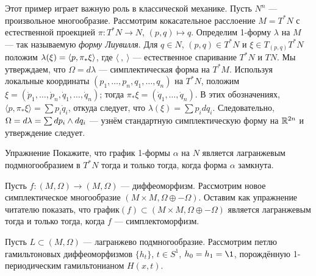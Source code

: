 Этот пример играет важную роль в классической механике.
Пусть $N^n$ --- произвольное многообразие.
Рассмотрим кокасательное расслоение $M = T^\ast N$ с естественной
проекцией $\pi\colon T^\ast N \to N$, $(p, q) \mapsto q$.
Определим 1-форму $\lambda$ на $M$ --- так называемую \emph{форму Лиувилля}.
Для $q \in N$, $(p, q) \in T^\ast N$ и $\xi \in T_{(p, q)} T^\ast N$ положим $\lambda (\xi) \z= \langle p, \pi_\ast \xi \rangle$, где $\langle\ ,\ \rangle$ --- естественное спаривание $T^\ast N$ и $TN$.
Мы утверждаем, что $\Omega = d\lambda$ --- симплектическая форма на $T^\ast M$.
Используя локальные координаты $(p_1,\dots, p_n, q_1,\dots, q_n)$ на $T^\ast N$, положим $\xi = (\dot p_1 ,\dots, \dot p_n, \dot q_1,\dots,\dot q_n)$;
тогда $\pi_\ast \xi = (\dot q_1,\dots, \dot q_n)$.
В этих обозначениях, $\langle p, \pi_\ast \xi\rangle=\sum p_i \dot q_i$, откуда следует, что $\lambda (\xi) =\sum p_i dq_i$.
Следовательно, $\Omega = d\lambda =\sum dp_i \z\wedge dq_i$ --- узнём стандартную симплектическую форму на $\mathbb{R}^{2n}$ и утверждение следует.

\begin{thm*}{Упражнение}
Покажите, что график 1-формы $\alpha$ на $N$ является лагранжевым подмногообразием в $T^\ast N$ тогда и только тогда, когда форма $\alpha$ замкнута.
\end{thm*}

\begin{thm}{}\label{3.1.D}
\end{thm}

Пусть $f\colon (M, \Omega) \to (M, \Omega)$ --- диффеоморфизм.
Рассмотрим новое симплектическое многообразие $(M \times M, \Omega \oplus -\Omega)$.
Оставим как упражнение читателю показать, что график$(f) \subset (M \times M, \Omega \oplus -\Omega)$ является лагранжевым тогда и только тогда, когда $f$ --- симплектоморфизм.


\begin{thm}{}\label{3.1.E}
\end{thm}

Пусть $L \subset (M, \Omega)$ --- лагранжево подмногообразие.
Рассмотрим петлю гамильтоновых диффеоморфизмов $\{h_t\}$, $t \in S^1$, $h_0 = h_1 = \1$, порождённую 1-периодическим гамильтонианом $H (x, t)$.


